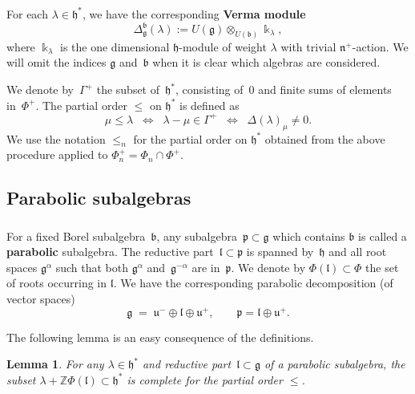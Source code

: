 \documentclass[11pt]{amsart}
\newcommand{\rR}{\Phi}
\newcommand{\mk}{\Bbbk}
\newcommand{\fn}{\mathfrak{n}}
\newcommand{\fg}{\mathfrak{g}}
\newcommand{\fp}{\mathfrak{p}}
\newcommand{\fl}{\mathfrak{l}}
\newcommand{\fu}{\mathfrak{u}}
\newcommand{\fh}{\mathfrak{h}}
\newcommand{\fb}{\mathfrak{b}}
\newcommand{\mZ}{\mathbb{Z}}
\numberwithin{equation}{section}
\theoremstyle{plain}
\newtheorem{lemma}[subsubsection]{Lemma}
\theoremstyle{remark}
\newtheorem{rem}[subsubsection]{Remark}
\theoremstyle{remark}
\theoremstyle{construction}
\begin{document}
\subsubsection{}
For each $\lambda\in\fh^\ast$, we have the corresponding {\bf Verma module} 
\begin{equation}\label{Verma}\Delta^{\fb}_{\fg}(\lambda):=U(\fg)\otimes_{U(\fb)}\mk_\lambda,\end{equation}
where $\mk_\lambda$ is the one dimensional $\fh$-module of weight $\lambda$ with trivial $\fn^+$-action. We will {omit} the indices $\fg$ and~$\fb$ when it is clear which algebras are considered.

We denote by~$\Gamma^+$ the subset of~$\fh^\ast$, consisting of~$0$ and finite sums of elements in~$\rR^+$. The partial order $\le$ on $\fh^\ast$ is defined as
$$\mu\le\lambda\;\;\Leftrightarrow\;\; \lambda-\mu\in\Gamma^+\;\;\Leftrightarrow\;\; \Delta(\lambda)_\mu\not=0.$$
We use the notation $\le_n$ for the partial order on $\fh^\ast$ obtained from the above procedure applied to $\rR_n^+=\rR_n\cap\rR^+$.





\subsection{Parabolic subalgebras}


\subsubsection{}
For a fixed Borel subalgebra~$\fb$, any subalgebra~$\fp\subset\fg$ which contains $\fb$ is called a {\bf parabolic} subalgebra. The reductive part~$\fl\subset\fp$ is spanned by~$\fh$ and all root spaces $\fg^\alpha$ such that both $\fg^\alpha$ and~$\fg^{-\alpha}$ are in~$\fp$. We denote by $\Phi(\fl)\subset\Phi$ the set of roots occurring in $\fl$. We have the corresponding parabolic decomposition (of vector spaces)
$$\fg\;=\;\fu^-\oplus\fl\oplus\fu^+,\qquad\fp=\fl\oplus\fu^+.$$

The following lemma is an easy consequence of the definitions.
\begin{lemma}\label{LemComplete}
For any $\lambda\in\fh^\ast$ and reductive part~$\fl\subset\fg$ of a parabolic subalgebra, the subset $\lambda+\mZ\rR(\fl)\subset\fh^\ast$ is complete for {the partial order} $\le$.
\end{lemma}
\end{document}
